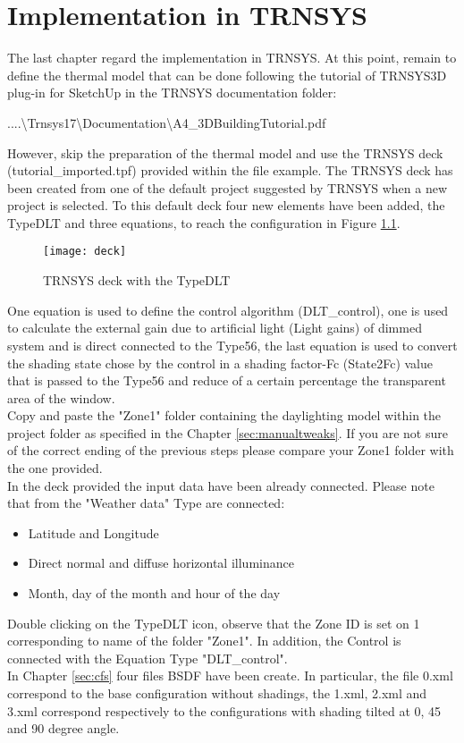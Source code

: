 \chapter{Implementation in TRNSYS}

The last chapter regard the implementation in TRNSYS. At this point, remain to define the thermal model that can be done following the tutorial of TRNSYS3D plug-in for SketchUp in the TRNSYS documentation folder:
\begin{center}
....\textbackslash Trnsys17\textbackslash Documentation\textbackslash A4\_3DBuildingTutorial.pdf
\end{center} 
However, skip the preparation of the thermal model and use the TRNSYS deck (tutorial\_imported.tpf) provided within the file example. The TRNSYS deck has been created from one of the default project suggested by TRNSYS when a new project is selected. To this default deck four new elements have been added, the TypeDLT and three equations, to reach the configuration in  Figure \ref{img5:deck}. 
\begin{figure}[H]
\centering
\texttt{[image: deck]}
\caption{\label{img5:deck} TRNSYS deck with the TypeDLT}
\end{figure}
One equation is used to define the control algorithm (DLT\_control), one is used to calculate the external gain due to artificial light (Light gains) of dimmed system and is direct connected to the Type56, the last equation is used to convert the shading state chose by the control in a shading factor-Fc (State2Fc) value that is passed to the Type56 and reduce of a certain percentage the transparent area of the window.\\
Copy and paste the "Zone1" folder containing the daylighting model within the project folder as specified in the Chapter \ref{sec:manualtweaks}. If you are not sure of the correct ending of the previous steps please compare your Zone1 folder with the one provided. \\
In the deck provided the input data have been already connected. Please note that from the "Weather data" Type are connected:
\begin{itemize}
\renewcommand{\labelitemi}{\tiny$\blacksquare$}
\item Latitude and Longitude 
\item Direct normal and diffuse horizontal illuminance
\item Month, day of the month and hour of the day
\end{itemize}  
Double clicking on the TypeDLT icon, observe that the Zone ID is set on 1 corresponding to name of the folder "Zone1". In addition, the Control is connected with the Equation Type "DLT\_control".\\
In Chapter \ref{sec:cfs} four files BSDF have been create. In particular, the file 0.xml correspond to the base configuration without shadings, the 1.xml, 2.xml and 3.xml correspond respectively to the configurations with shading tilted at 0, 45 and 90 degree angle.

